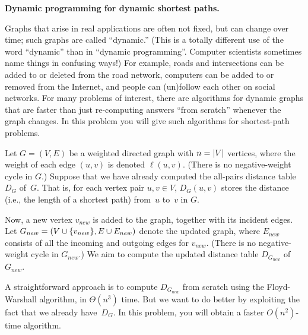 \documentclass[11pt,addpoints]{exam}
\begin{document}
\begin{questions}
\begin{parts}
\begin{solution}
    \end{solution}
  \end{parts}

  \question \textbf{Dynamic programming for dynamic shortest paths.}
  
  Graphs that arise in real applications are often not fixed, but can change over time; such graphs are called ``dynamic.''
  (This is a totally different use of the word ``dynamic'' than in ``dynamic programming''.
  Computer scientists sometimes name things in confusing ways!)
  For example, roads and intersections can be added to or deleted from the road network, computers can be added to or removed from the Internet, and people can (un)follow each other on social networks.
  For many problems of interest, there are algorithms for dynamic graphs that are faster than just re-computing answers ``from scratch'' whenever the graph changes.
  In this problem you will give such algorithms for shortest-path problems.
  
  Let $G=(V, E)$ be a weighted directed graph with $n=\lvert V\rvert$ vertices, where the weight of each edge $(u,v)$ is denoted $\ell(u,v)$.
  (There is no negative-weight cycle in $G$.)
  Suppose that we have already computed the all-pairs distance table~$D_G$ of~$G$.
  That is, for each vertex pair $u,v \in V$, $D_G(u,v)$ stores the distance (i.e., the length of a shortest path) from~$u$ to~$v$ in $G$.

  Now, a new vertex $v_{new}$ is added to the graph, together with its incident edges.
  Let $G_{new}= (V \cup \{v_{new}\}, E \cup E_{new})$ denote the updated graph, where $E_{new}$ consists of all the incoming and outgoing edges for $v_{new}$.
  (There is no negative-weight cycle in $G_{new}$.)
  We aim to compute the updated distance table $D_{G_{new}}$ of~$G_{new}$.

  A straightforward approach is to compute $D_{G_{new}}$ from scratch using the Floyd-Warshall algorithm, in $\Theta(n^3)$ time.
  But we want to do better by exploiting the fact that we already have~$D_G$.
  In this problem, you will obtain a faster $O(n^2)$-time algorithm.

\end{questions}
\end{document}
